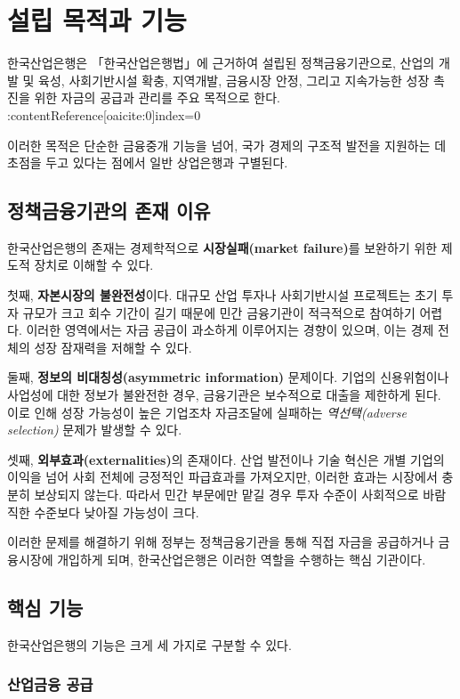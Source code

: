 \section{설립 목적과 기능}

한국산업은행은 「한국산업은행법」에 근거하여 설립된 정책금융기관으로, 산업의 개발 및 육성, 사회기반시설 확충, 지역개발, 금융시장 안정, 그리고 지속가능한 성장 촉진을 위한 자금의 공급과 관리를 주요 목적으로 한다. :contentReference[oaicite:0]{index=0}  

이러한 목적은 단순한 금융중개 기능을 넘어, 국가 경제의 구조적 발전을 지원하는 데 초점을 두고 있다는 점에서 일반 상업은행과 구별된다.

\subsection{정책금융기관의 존재 이유}

한국산업은행의 존재는 경제학적으로 \textbf{시장실패(market failure)}를 보완하기 위한 제도적 장치로 이해할 수 있다.

첫째, \textbf{자본시장의 불완전성}이다.  
대규모 산업 투자나 사회기반시설 프로젝트는 초기 투자 규모가 크고 회수 기간이 길기 때문에 민간 금융기관이 적극적으로 참여하기 어렵다. 이러한 영역에서는 자금 공급이 과소하게 이루어지는 경향이 있으며, 이는 경제 전체의 성장 잠재력을 저해할 수 있다.

둘째, \textbf{정보의 비대칭성(asymmetric information)} 문제이다.  
기업의 신용위험이나 사업성에 대한 정보가 불완전한 경우, 금융기관은 보수적으로 대출을 제한하게 된다. 이로 인해 성장 가능성이 높은 기업조차 자금조달에 실패하는 \textit{역선택(adverse selection)} 문제가 발생할 수 있다.

셋째, \textbf{외부효과(externalities)}의 존재이다.  
산업 발전이나 기술 혁신은 개별 기업의 이익을 넘어 사회 전체에 긍정적인 파급효과를 가져오지만, 이러한 효과는 시장에서 충분히 보상되지 않는다. 따라서 민간 부문에만 맡길 경우 투자 수준이 사회적으로 바람직한 수준보다 낮아질 가능성이 크다.

이러한 문제를 해결하기 위해 정부는 정책금융기관을 통해 직접 자금을 공급하거나 금융시장에 개입하게 되며, 한국산업은행은 이러한 역할을 수행하는 핵심 기관이다.

\subsection{핵심 기능}

한국산업은행의 기능은 크게 세 가지로 구분할 수 있다.

\subsubsection{산업금융 공급}

